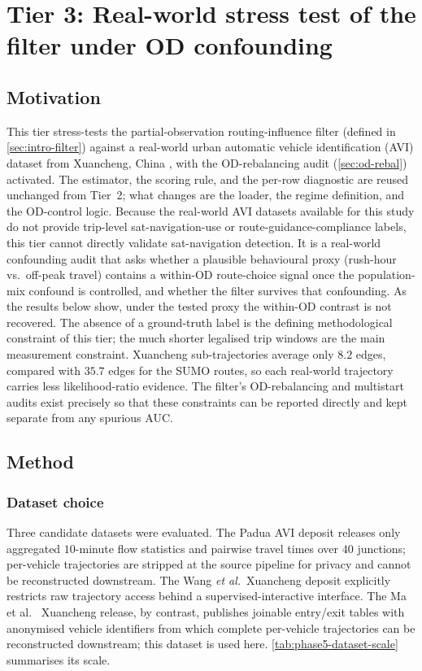 \section{Tier 3: Real-world stress test of the filter under OD confounding}
\label{sec:phase5-xuancheng}

\subsection{Motivation}

This tier stress-tests the partial-observation routing-influence filter
(defined in \cref{sec:intro-filter}) against a real-world urban
automatic vehicle identification (AVI) dataset from Xuancheng, China
\cite{ma2026xuancheng}, with the OD-rebalancing audit
(\cref{sec:od-rebal}) activated. The estimator, the scoring rule, and
the per-row diagnostic are reused unchanged from Tier~2; what changes are
the loader, the regime definition, and the OD-control logic. Because the
real-world AVI datasets available for this study do not provide
trip-level sat-navigation-use or route-guidance-compliance labels, this
tier cannot directly validate sat-navigation detection. It is a
real-world confounding audit
that asks whether a plausible behavioural proxy (rush-hour vs.\
off-peak travel) contains a within-OD route-choice signal once the
population-mix confound is controlled, and whether the filter survives
that confounding. As the results below show, under the tested proxy the
within-OD contrast is not recovered. The absence of a ground-truth label
is the defining methodological constraint of this tier; the much shorter
legalised trip windows are the main measurement constraint. Xuancheng
sub-trajectories average only $8.2$ edges, compared with $35.7$ edges for
the SUMO routes, so each real-world trajectory carries less
likelihood-ratio evidence. The filter's OD-rebalancing and multistart
audits exist precisely so that these constraints can be reported directly
and kept separate from any spurious AUC.

\subsection{Method}

\subsubsection{Dataset choice}\label{sec:phase5-dataset}

Three candidate datasets were evaluated. The Padua AVI deposit
\cite{cappi2026} releases only aggregated $10$-minute flow statistics
and pairwise travel times over $40$ junctions; per-vehicle trajectories
are stripped at the source pipeline for privacy and cannot be
reconstructed downstream. The Wang \emph{et al.}\ Xuancheng deposit
\cite{wang2023xuancheng} explicitly restricts raw trajectory access
behind a supervised-interactive interface. The
Ma et al.~\cite{ma2026xuancheng} Xuancheng release, by contrast, publishes
joinable entry/exit tables with anonymised vehicle identifiers from
which complete per-vehicle trajectories can be reconstructed downstream;
this dataset is used here. \cref{tab:phase5-dataset-scale} summarises
its scale.

